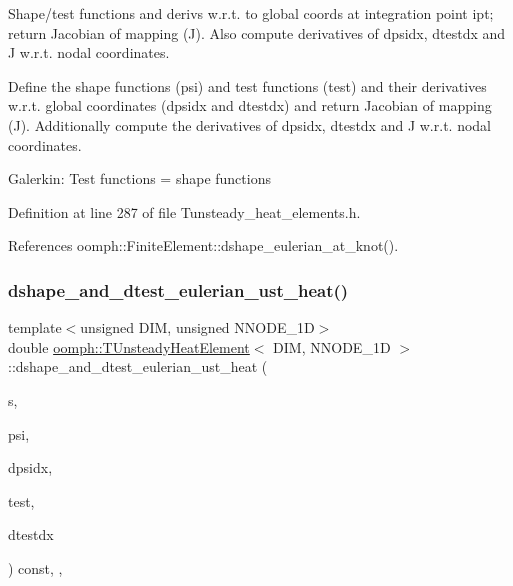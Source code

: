 Shape/test functions and derivs w.\+r.\+t. to global coords at integration point ipt; return Jacobian of mapping (J). Also compute derivatives of dpsidx, dtestdx and J w.\+r.\+t. nodal coordinates. 

Define the shape functions (psi) and test functions (test) and their derivatives w.\+r.\+t. global coordinates (dpsidx and dtestdx) and return Jacobian of mapping (J). Additionally compute the derivatives of dpsidx, dtestdx and J w.\+r.\+t. nodal coordinates.

Galerkin\+: Test functions = shape functions 

Definition at line 287 of file Tunsteady\+\_\+heat\+\_\+elements.\+h.



References oomph\+::\+Finite\+Element\+::dshape\+\_\+eulerian\+\_\+at\+\_\+knot().

\mbox{\label{classoomph_1_1TUnsteadyHeatElement_ab957ee8223e82d47e75eafde43c1a3e3}} 
\subsubsection{\texorpdfstring{dshape\+\_\+and\+\_\+dtest\+\_\+eulerian\+\_\+ust\+\_\+heat()}{dshape\_and\_dtest\_eulerian\_ust\_heat()}}
{\footnotesize\ttfamily template$<$unsigned D\+IM, unsigned N\+N\+O\+D\+E\+\_\+1D$>$ \\
double \hyperlink{classoomph_1_1TUnsteadyHeatElement}{oomph\+::\+T\+Unsteady\+Heat\+Element}$<$ D\+IM, N\+N\+O\+D\+E\+\_\+1D $>$\+::dshape\+\_\+and\+\_\+dtest\+\_\+eulerian\+\_\+ust\+\_\+heat (\begin{DoxyParamCaption}\item[{const \hyperlink{classoomph_1_1Vector}{Vector}$<$ double $>$ \&}]{s,  }\item[{\hyperlink{classoomph_1_1Shape}{Shape} \&}]{psi,  }\item[{\hyperlink{classoomph_1_1DShape}{D\+Shape} \&}]{dpsidx,  }\item[{\hyperlink{classoomph_1_1Shape}{Shape} \&}]{test,  }\item[{\hyperlink{classoomph_1_1DShape}{D\+Shape} \&}]{dtestdx }\end{DoxyParamCaption}) const\hspace{0.3cm}{\ttfamily [inline]}, {\ttfamily [protected]}, {\ttfamily [virtual]}}



